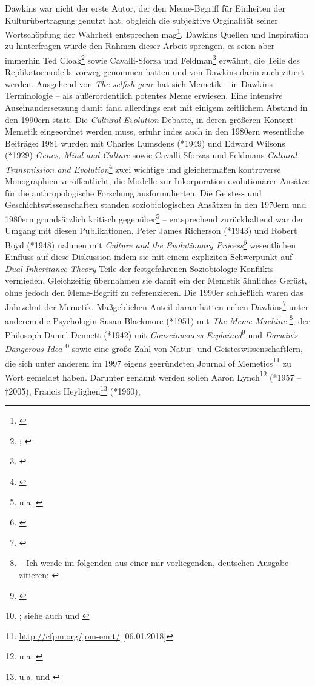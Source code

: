 \documentclass[openany,twoside,twocolumn]{book}
\let\rmarkdownfootnote\footnote%
\def\footnote{\protect\rmarkdownfootnote}
\begin{document}
Dawkins war nicht der erste Autor, der den Meme-Begriff für Einheiten der Kulturübertragung genutzt hat, obgleich die subjektive Orginalität seiner Wortschöpfung der Wahrheit entsprechen mag\footnote{\textcite{laurent_note_1999}}. Dawkins Quellen und Inspiration zu hinterfragen würde den Rahmen dieser Arbeit sprengen, es seien aber immerhin Ted Cloak\footnote{\textcite{cloak_cultural_1966}; \textcite{cloak_is_1975}} sowie Cavalli-Sforza und Feldman\footnote{\textcite{cavalli-sforza_models_1973}} erwähnt, die Teile des Replikatormodells vorweg genommen hatten und von Dawkins darin auch zitiert werden. Ausgehend von \emph{The selfish gene} hat sich Memetik -- in Dawkins Terminologie -- als außerordentlich potentes Meme erwiesen. Eine intensive Auseinandersetzung damit fand allerdings erst mit einigem zeitlichem Abstand in den 1990ern statt. Die \emph{Cultural Evolution} Debatte, in deren größeren Kontext Memetik eingeordnet werden muss, erfuhr indes auch in den 1980ern wesentliche Beiträge: 1981 wurden mit Charles Lumsdens (*1949) und Edward Wilsons (*1929) \emph{Genes, Mind and Culture} \autocite[ -- Lumsden und Wilson führen mit \emph{Culturgen} eine dem Meme ähnliche Beobachtungseinheit ein.]{lumsden_genes_1981} sowie Cavalli-Sforzas und Feldmans \emph{Cultural Transmission and Evolution}\footnote{\textcite{cavalli-sforza_cultural_1981}} zwei wichtige und gleichermaßen kontroverse Monographien veröffentlicht, die Modelle zur Inkorporation evolutionärer Ansätze für die anthropologische Forschung ausformulierten. Die Geistes- und Geschichtswissenschaften standen soziobiologischen Ansätzen in den 1970ern und 1980ern grundsätzlich kritisch gegenüber\footnote{u.a. \textcite{sahlins_use_1976}} -- entsprechend zurückhaltend war der Umgang mit diesen Publikationen. Peter James Richerson (*1943) und Robert Boyd (*1948) nahmen mit \emph{Culture and the Evolutionary Process}\footnote{\textcite{boyd_culture_1985}} wesentlichen Einfluss auf diese Diskussion indem sie mit einem expliziten Schwerpunkt auf \emph{Dual Inheritance Theory} Teile der festgefahrenen Soziobiologie-Konflikts vermieden. Gleichzeitig übernahmen sie damit ein der Memetik ähnliches Gerüst, ohne jedoch den Meme-Begriff zu referenzieren. Die 1990er schließlich waren das Jahrzehnt der Memetik. Maßgeblichen Anteil daran hatten neben Dawkins\footnote{\textcite{dawkins_viruses_1993}} unter anderem die Psychologin Susan Blackmore (*1951) mit \emph{The Meme Machine} \footnote{\textcite{blackmore_meme_1999} -- Ich werde im folgenden aus einer mir vorliegenden, deutschen Ausgabe zitieren: \textcite{blackmore_macht_2000}}, der Philosoph Daniel Dennett (*1942) mit \emph{Consciousness Explained}\footnote{\textcite{dennett_consciousness_1991}} und \emph{Darwin's Dangerous Idea}\footnote{\textcite{dennett_darwins_1995}; siehe auch \textcite{dennett_brainstorms_1978} und \textcite{dennett_elbow_1984}} sowie eine große Zahl von Natur- und Geisteswissenschaftlern, die sich unter anderem im 1997 eigens gegründeten Journal of Memetics\footnote{\url{http://cfpm.org/jom-emit/} {[}06.01.2018{]}} zu Wort gemeldet haben. Darunter genannt werden sollen Aaron Lynch\footnote{u.a. \textcite{lynch_thought_1996}} (*1957 -- †2005), Francis Heylighen\footnote{u.a. \textcite{heylighen_evolution_1996} und \textcite{heylighen_selfish_1992}} (*1960), 
\end{document}
